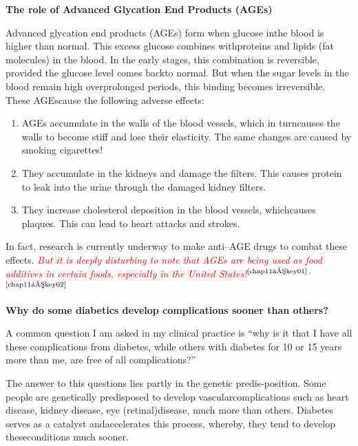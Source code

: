 \noindent\textbf{The role of Advanced Glycation End Products (AGEs)}

Advanced glycation end products (AGEs) form when glucose in\break the blood is higher than normal. This excess glucose combines with\break proteins and lipids (fat molecules) in the blood. In the early stages, this combination is reversible, provided the glucose level comes back\break to normal. But when the sugar levels in the blood remain high over\break prolonged periods, this binding becomes irreversible. These AGEs\break cause the following adverse effects:

\vspace{-\topsep}
\begin{enumerate}[•]
\itemsep=0pt
\item AGEs accumulate in the walls of the blood vessels, which in turn\break causes the walls to become stiff and lose their elasticity. The same changes are caused by smoking cigarettes!
\item They accumulate in the kidneys and damage the filters. This causes protein to leak into the urine through the damaged kidney filters.
\item They increase cholesterol deposition in the blood vessels, which\break causes plaques. This can lead to heart attacks and strokes.
\end{enumerate}
\vspace{-\topsep}

In fact, research is currently underway to make anti–AGE drugs to combat these effects. \textcolor{red}{\textit{But it is deeply disturbing to note that AGEs are being used as food additives in certain foods, especially in the United States!}}$^{\text{\cite{chap11–key01}}}$$^,$$^{\text{\cite{chap11–key02}}}$

\vskip 5pt
\noindent\textbf{Why do some diabetics develop complications sooner than others?}
\vskip 3pt

A common question I am asked in my clinical practice is “why is it that I have all these complications from diabetes, while others with diabetes for 10 or 15 years more than me, are free of all complications?”

The answer to this questions lies partly in the genetic predis-\break position. Some people are genetically predisposed to develop vascular\break complications such as heart disease, kidney disease, eye (retinal)\break disease, much more than others. Diabetes serves as a catalyst and\break accelerates this process, whereby, they tend to develop these\break conditions much sooner.

